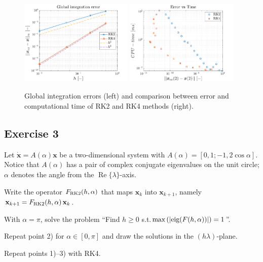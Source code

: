 \documentclass[11pt,a4paper,oneside]{article}
\renewcommand{\vec}[1]{\mathbf{#1}}
\begin{document}
\begin{figure}[ht]
    \centering
    \includegraphics[width = 0.48\textwidth]{gfx/ex2_5.pdf}
    \includegraphics[width = 0.48\textwidth]{gfx/ex2_6.pdf}
    \caption{Global integration errors (left) and comparison between error and computational time of RK2 and RK4 methods (right).}
    \label{fig:ex2_globErr}
\end{figure}

\subsection*{Exercise 3}

Let $\dot{\vec x} = A(\alpha) \vec x$ be a two-dimensional system with $A(\alpha) = [0, 1; -1, 2\cos\alpha]$. Notice that $A(\alpha)$ has a pair of complex conjugate eigenvalues on the unit circle; $\alpha$ denotes the angle from the $\operatorname{Re}\{\lambda\}$-axis. 
\begin{enumerate*}[label=\arabic*)]
    \item Write the operator $F_{\rm RK2}(h,\alpha)$ that maps $\vec x_k$ into $\vec x_{k+1}$, namely $\vec x_{k+1} = F_{\rm RK2}(h,\alpha) \, \vec x_k$.
    \item\!With $\alpha = \pi$, solve the problem ``Find $h\ge 0$ s.t.$\max\left(|{\rm eig}(F(h,\alpha))|\right) = 1$''.
    \item Repeat point 2) for $\alpha\in[0, \pi]$ and draw the solutions in the $(h\lambda)$-plane.
    \item Repeat points 1)--3) with RK4.
\end{enumerate*}
\end{document}
